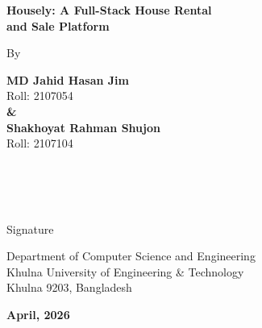 \documentclass[12pt,a4paper]{report}
\begin{document}
\begin{center}
{\fontsize{18}{27}\bfseries
Housely: A Full-Stack House Rental\\[4pt]
and Sale Platform}

\vspace{36pt}

{\fontsize{12}{18}\normalfont By}

\vspace{24pt}

{\fontsize{12}{18}\bfseries MD Jahid Hasan Jim}\\
{\fontsize{12}{18}\normalfont Roll: 2107054}\\[6pt]
{\fontsize{12}{18}\bfseries \&}\\[6pt]
{\fontsize{12}{18}\bfseries Shakhoyat Rahman Shujon}\\
{\fontsize{12}{18}\normalfont Roll: 2107104}

\vspace{48pt}
\end{center}


\vspace{4pt}
\\
\\
\\
\hfill\underline{\hspace{1.5in}}

\hfill Signature

\vspace{36pt}
\begin{center}
{\fontsize{12}{18}\normalfont
Department of Computer Science and Engineering\\
Khulna University of Engineering \& Technology\\
Khulna 9203, Bangladesh}

\vspace{6pt}
{\fontsize{16}{24}\bfseries April, 2026}
\end{center}
\clearpage

\end{document}
